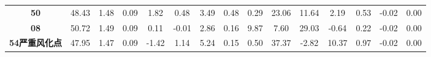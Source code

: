 \documentclass[withoutpreface,bwprint]{cumcmthesis} %
\begin{document}
\begin{appendices}
\begin{table}[!h]
\begin{tabular}{@{}ccccccccccccccc@{}}
			\textbf{50}      & 48.43                                                          & 1.48                                                          & 0.09                                                         & 1.82                                                         & 0.48                                                         & 3.49                                                           & 0.48                                                           & 0.29                                                         & 23.06                                                        & 11.64                                                        & 2.19                                                            & 0.53                                                         & -0.02                                                         & 0.00                                                          \\
			\textbf{08}      & 50.72                                                          & 1.49                                                          & 0.09                                                         & 0.11                                                         & -0.01                                                        & 2.86                                                           & 0.16                                                           & 9.87                                                         & 7.60                                                         & 29.03                                                        & -0.64                                                           & 0.22                                                         & -0.02                                                         & 0.00                                                          \\
			\textbf{54严重风化点} & 47.95                                                          & 1.47                                                          & 0.09                                                         & -1.42                                                        & 1.14                                                         & 5.24                                                           & 0.15                                                           & 0.50                                                         & 37.37                                                        & -2.82                                                        & 10.37                                                           & 0.97                                                         & -0.02                                                         & 0.00                                                          \\

\end{tabular}
\end{table}
\end{appendices}
\end{document}
